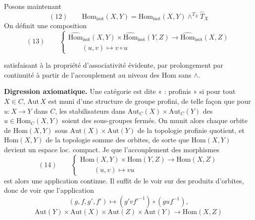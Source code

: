 \documentclass[11pt,a4paper]{article}
\begin{document}
Posons maintenant
\[
  (12)\qquad \widehat{\mathrm{Hom}}_{\mathrm{isot}}(X,Y)=\mathrm{Hom}_{\mathrm{isot}}(X,Y)\wedge^{T_{X}}\widehat{T}_{X}
\]
On définit une composition
\[
  (13)\qquad
  \begin{cases}
    \widehat{\mathrm{Hom}}_{\mathrm{isot}}(X,Y)\times\widehat{\mathrm{Hom}}_{\mathrm{isot}}(Y,Z)\longrightarrow\widehat{\mathrm{Hom}}_{\mathrm{isot}}(X,Z)\\
    \qquad (u,v)\longmapsto v\circ u
  \end{cases}
\]

satisfaisant à la propriété d'associativité évidente, par prolongement par continuité à partir de l'accouplement au niveau des $\mathrm{Hom}$ sans $\wedge$. 

\textbf{Digression axiomatique.}
Une catégorie  est dite «  :   profinis » si pour tout $X\in C$, $\mathrm{Aut}\,X$ est muni d'une structure de groupe profini, de telle façon que pour $u\colon X\to Y$ dans $C$, les stabilisateurs dans $\mathrm{Aut}_{C}(X)\times\mathrm{Aut}_{C}(Y)$ \struck{\ill{}} des $u\in\mathrm{Hom}_{C}(X,Y)$  soient des sous-groupes fermés. \struck{\ill{}} On munit alors chaque orbite de $\mathrm{Hom}(X,Y)$ sous $\mathrm{Aut}(X)\times\mathrm{Aut}(Y)$ de la topologie profinie quotient, et $\mathrm{Hom}(X,Y)$ de la topologie  somme des orbites, de sorte que $\mathrm{Hom}(X,Y)$ devient un espace loc. compact. Je \struck{\ill{}}  que l'accouplement des morphismes
\[
  (14)\qquad
  \begin{cases}
    \mathrm{Hom}(X,Y)\times\mathrm{Hom}(Y,Z)\longrightarrow\mathrm{Hom}(X,Z)\\
    \qquad (u,v)\longmapsto vu
  \end{cases}
\]
est alors \struck{\ill{}} une \struck{\ill{}} application continue. Il suffit de le voir sur des produits d'orbites, donc de voir que  l'application
\[
  (g,f,g',f')\longmapsto (g'vf'^{-1})\circ(guf^{-1}),
\]
\[
  \mathrm{Aut}(Y)\times\mathrm{Aut}(X)\times\mathrm{Aut}(Z)\times\mathrm{Aut}(Y)\longrightarrow\mathrm{Hom}(X,Z)
\]
\end{document}
